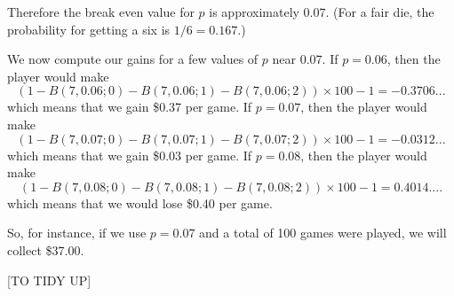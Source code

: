Therefore the break even value for $p$ is approximately $0.07$.
(For a fair die, the probability for getting a six is $1/6 = 0.167$.)

We now compute our gains for a few values of $p$ near $0.07$.
If $p = 0.06$, then the player would make
\[
(1 - B(7,0.06;0) - B(7,0.06;1) - B(7,0.06;2)) \times 100 - 1
=
-0.3706...
\]
which means that we gain \$0.37 per game.
If $p = 0.07$, then the player would make
\[
(1 - B(7,0.07;0) - B(7,0.07;1) - B(7,0.07;2)) \times 100 - 1
=
-0.0312...
\]
which means that we gain \$0.03 per game.
If $p = 0.08$, then the player would make
\[
(1 - B(7,0.08;0) - B(7,0.08;1) - B(7,0.08;2)) \times 100 - 1
= 0.4014....
\]
which means that we would lose \$0.40 per game.

So, for instance, if we use $p = 0.07$ and a total of 100 games were
played, we will collect \$37.00.




[TO TIDY UP]
